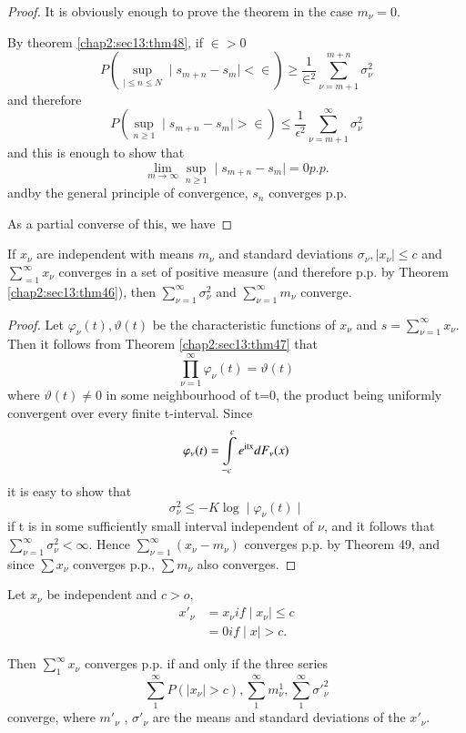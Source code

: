 \begin{proof}
  It is obviously enough to prove the theorem in the case $m_\nu=0$. 

  By theorem \ref{chap2:sec13:thm48}, if $\in > 0$
  $$
  P \left(\sup\limits_{\mid \leq n \leq N}\mid s_{m+n}-s_m\mid < \in \right) \geq
  \frac{1}{\in ^2} \sum\limits^{m+n}_{\nu=m+1} \sigma^2_\nu
  $$
  and therefore 
  $$
  P\left(\sup\limits_{n \geq 1}\mid s_{m+n} -s_m\mid > \in\right) \leq
  \frac{1}{\epsilon^2} \sum\limits^\infty_{\nu=m+1} \sigma^2_\nu
  $$
  and this is enough to show that  
  $$
  \lim\limits_{m \rightarrow \infty} \sup\limits_{n \geq 1} \mid
  s_{m+n}-s_m\mid=0 p.p.
  $$
  and\pageoriginale by the general principle of convergence, $s_n$
  converges p.p. 
  
  As a partial converse of this, we have
\end{proof}

\begin{theorem}\label{chap2:sec13:thm50} %
  If $x_\nu$ are independent with means $m_\nu$ and standard deviations
  $\sigma_\nu, \mid x_\nu \mid \le c$ and $\displaystyle\sum^\infty_{=1}
  x_\nu $ converges in a set of positive measure (and therefore p.p. by
  Theorem \ref{chap2:sec13:thm46}), then $\displaystyle\sum^\infty_{\nu=1} \sigma^2_\nu$ and
  $\displaystyle\sum^\infty_{\nu=1} m_\nu$ converge. 
\end{theorem}

\begin{proof}
  Let $\varphi_\nu (t), \vartheta(t)$ be the characteristic functions of
  $x_\nu$ and $s=\displaystyle\sum^\infty_{\nu=1} x_\nu$. Then it follows from
  Theorem \ref{chap2:sec13:thm47} that  
  $$
  \prod^\infty_{\nu=1} \varphi_\nu(t)=\vartheta(t)
  $$
  where $\vartheta(t)\neq 0$ in some neighbourhood of t=0, the product
  being uniformly convergent over every finite t-interval. Since 
  $$
  \varphi_\nu(t)=\int\limits^c_{-c} e^{\rm itx} d F_\nu(x)
  $$
  it is easy to show that
  $$
  \sigma^2_\nu \le-K \log \mid \varphi_\nu(t)\mid
  $$
  if t is in some sufficiently small interval independent of $\nu$, and
  it follows that $\displaystyle\sum^\infty_{\nu=1} \sigma^2_\nu <
  \infty$. Hence $\displaystyle\sum^\infty_{\nu=1}(x_\nu-m_\nu)$
  converges p.p. by Theorem 49, and since $\sum x_\nu$ converges p.p.,
  $\sum m_\nu$ also converges. 
\end{proof}

\begin{theorem}\label{chap2:sec13:thm51} %
  Let $x_\nu$ be independent and $c> o,$
  \begin{align*}
    x'_\nu& = x_\nu if\mid x_\nu \mid \leq c\\
    & = 0 if \mid x \mid > c.
  \end{align*}\pageoriginale
  
  Then $\sum\limits_1^\infty x_\nu$ converges p.p. if and only if the
  three series 
  $$
  \sum^{\infty}_{1} P(\mid x_\nu \mid > c),\sum^{\infty}_{1} m_\nu^1 ,
  \sum^{\infty}_{1} \sigma'^2_\nu 
  $$
  converge, where $m '_\nu$ , $\sigma '_\nu$ are the means and standard
  deviations of the $x'_\nu$. 
\end{theorem}

